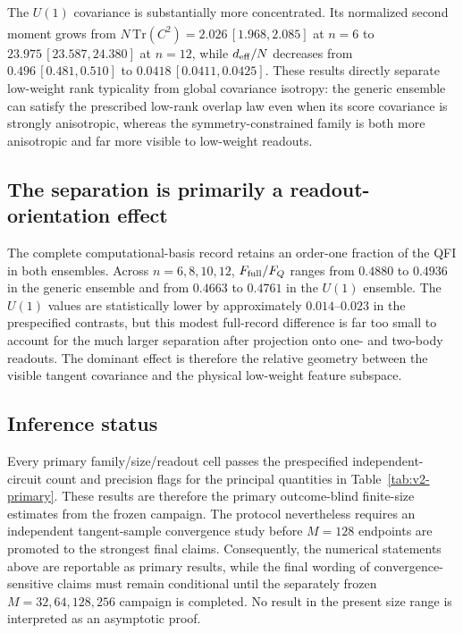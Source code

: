 The $U(1)$ covariance is substantially more concentrated.  Its normalized
second moment grows from
$N\,\widehat{\mathrm{Tr}(C^2)}=2.026\,[1.968,2.085]$ at $n=6$ to
$23.975\,[23.587,24.380]$ at $n=12$, while
$d_{\rm eff}/N$ decreases from $0.496\,[0.481,0.510]$ to
$0.0418\,[0.0411,0.0425]$.  These results directly separate low-weight
rank typicality from global covariance isotropy: the generic ensemble
can satisfy the prescribed low-rank overlap law even when its score
covariance is strongly anisotropic, whereas the symmetry-constrained
family is both more anisotropic and far more visible to low-weight
readouts.

\subsection{The separation is primarily a readout-orientation effect}

The complete computational-basis record retains an order-one fraction of
the QFI in both ensembles.  Across $n=6,8,10,12$,
$F_{\rm full}/F_Q$ ranges from $0.4880$ to $0.4936$ in the generic
ensemble and from $0.4663$ to $0.4761$ in the $U(1)$ ensemble.  The
$U(1)$ values are statistically lower by approximately $0.014$--$0.023$
in the prespecified contrasts, but this modest full-record difference is
far too small to account for the much larger separation after projection
onto one- and two-body readouts.  The dominant effect is therefore the
relative geometry between the visible tangent covariance and the
physical low-weight feature subspace.

\subsection{Inference status}

Every primary family/size/readout cell passes the prespecified independent-
circuit count and precision flags for the principal quantities in
Table~\ref{tab:v2-primary}.  These results are therefore the primary
outcome-blind finite-size estimates from the frozen campaign.  The
protocol nevertheless requires an independent tangent-sample convergence
study before $M=128$ endpoints are promoted to the strongest final
claims.  Consequently, the numerical statements above are reportable as
primary results, while the final wording of convergence-sensitive claims
must remain conditional until the separately frozen $M=32,64,128,256$
campaign is completed.  No result in the present size range is interpreted
as an asymptotic proof.
